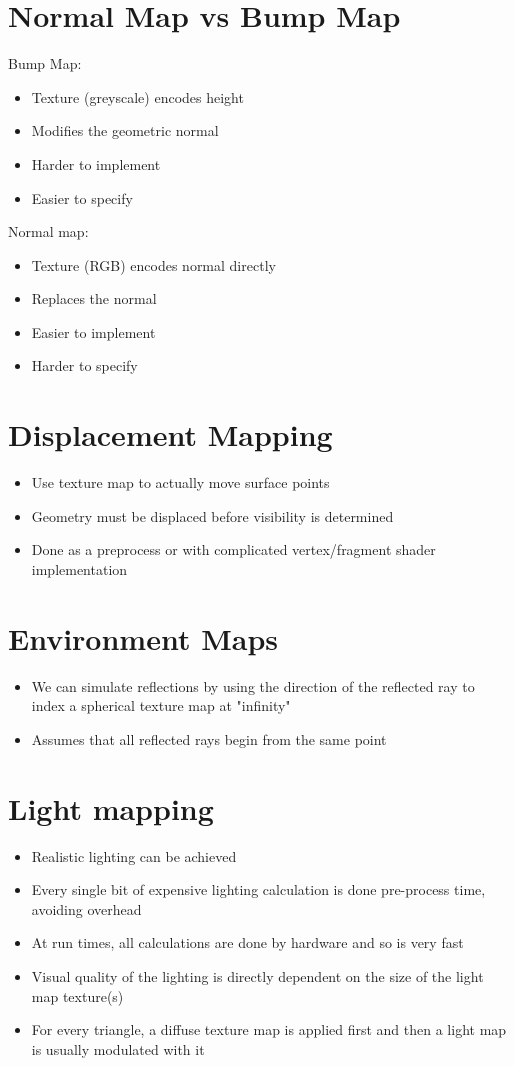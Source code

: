 \documentclass{article}[18pt]
\begin{document}
\section{Normal Map vs Bump Map}
Bump Map:
\begin{itemize}
	\item Texture (greyscale) encodes height
	\item Modifies the geometric normal
	\item Harder to implement
	\item Easier to specify
\end{itemize}
Normal map:
\begin{itemize}
	\item Texture (RGB) encodes normal directly
	\item Replaces the normal
	\item Easier to implement
	\item Harder to specify
\end{itemize}
\section{Displacement Mapping}
\begin{itemize}
	\item Use texture map to actually move surface points
	\item Geometry must be displaced before visibility is determined
	\item Done as a preprocess or with complicated vertex/fragment shader implementation
\end{itemize}
\section{Environment Maps}
\begin{itemize}
	\item We can simulate reflections by using the direction of the reflected ray to index a spherical texture map at "infinity"
	\item Assumes that all reflected rays begin from the same point
\end{itemize}
\section{Light mapping}
\begin{itemize}
	\item Realistic lighting can be achieved
	\item Every single bit of expensive lighting calculation is done pre-process time, avoiding overhead
	\item At run times, all calculations are done by hardware and so is very fast
	\item Visual quality of the lighting is directly dependent on the size of the light map texture(s)
	\item For every triangle, a diffuse texture map is applied first and then a light map is usually modulated with it
\end{itemize}
\end{document}
